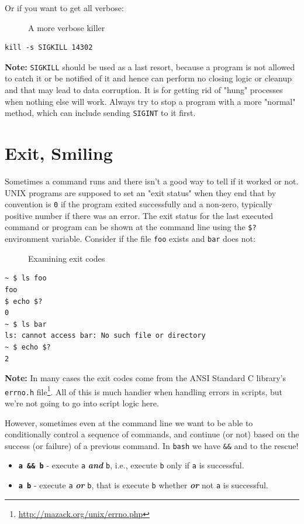 \documentclass[10pt,]{book}
\renewcommand{\href}[2]{#2\footnote{\url{#1}}}
\numberwithin{figure}{chapter}
\DeclareRobustCommand{\drcap}[1]{\begin{figure}[H]\caption{#1}\end{figure}}
\DeclareRobustCommand{\drenv}[1]{\index{Environment Variables!#1}}
\begin{document}
Or if you want to get all verbose:

\drcap{A more verbose killer}

\begin{verbatim}
kill -s SIGKILL 14302
\end{verbatim}

\textbf{Note:} \texttt{SIGKILL} should be used as a last resort, because
a program is not allowed to catch it or be notified of it and hence can
perform no closing logic or cleanup and that may lead to data
corruption. It is for getting rid of "hung" processes when nothing else
will work. Always try to stop a program with a more "normal" method,
which can include sending \texttt{SIGINT} to it first.

\section*{Exit, Smiling}\label{exit-smiling}

Sometimes a command runs and there isn't a good way to tell if it worked
or not. UNIX programs are supposed to set an "exit status" when they end
that by convention is \texttt{0} if the program exited successfully and
a non-zero, typically positive number if there was an error. The exit
status for the last executed command or program can be shown at the
command line using the \texttt{\$?}\drenv{Question mark} environment
variable. Consider if the file \texttt{foo} exists and \texttt{bar} does
not:

\drcap{Examining exit codes}

\begin{verbatim}
~ $ ls foo
foo
$ echo $?
0
~ $ ls bar
ls: cannot access bar: No such file or directory
~ $ echo $?
2
\end{verbatim}

\textbf{Note:} In many cases the exit codes come from the ANSI Standard
C library's \href{http://mazack.org/unix/errno.php}{\texttt{errno.h}
file}. All of this is much handier when handling errors in scripts, but
we're not going to go into script logic here.

However, sometimes even at the command line we want to be able to
conditionally control a sequence of commands, and continue (or not)
based on the success (or failure) of a previous command. In
\texttt{bash} we have \texttt{\&\&} and \texttt{\textbar{}\textbar{}} to
the rescue!

\begin{itemize}
\item
  \textbf{\texttt{a \&\& b}} - execute \texttt{a}
  \textbf{\emph{and}} \texttt{b}, i.e., execute \texttt{b} only if
  \texttt{a} is successful.
\item
  \textbf{\texttt{a \textbar{}\textbar{} b}} -
  execute \texttt{a} \textbf{\emph{or}} \texttt{b}, that is execute
  \texttt{b} whether \textbf{\emph{or}} not \texttt{a} is successful.
\end{itemize}
\end{document}
